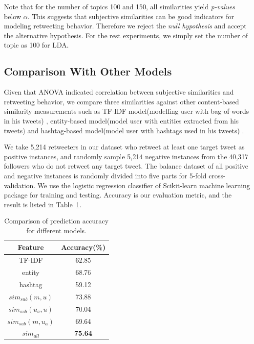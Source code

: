 \documentclass[letterpaper]{article}
\begin{document}
Note that for the number of topics 100 and 150, all similarities yield \textit{p-values} below $ \alpha $. This suggests that subjective similarities can be good indicators for modeling retweeting behavior. 
Therefore we reject the \textit{null hypothesis} and accept the alternative hypothesis.
For the rest experiments, we simply set the number of topic as 100 for LDA. 

\subsection{Comparison With Other Models}
\label{Comparison}

Given that ANOVA indicated correlation between subjective similarities and retweeting behavior, we compare three similarities against other content-based similarity measurements such as TF-IDF model(modelling user with bag-of-words in his tweets) \cite{Luo:2013RMF}, entity-based model(model user with entities extracted from his tweets) and hashtag-based model(model user with hashtags used in his tweets) \cite{Abel:2011AUM}.

We take 5,214 retweeters in our dataset who retweet at least one target tweet as positive instances, and randomly sample 5,214 negative instances from the 40,317 followers who do not retweet any target tweet.
The balance dataset of all positive and negative instances is randomly divided into five parts for 5-fold cross-validation. 
We use the logistic regression classifier of Scikit-learn machine learning package \cite{scikit-learn} for training and testing.
Accuracy is our evaluation metric, and the result is listed in Table~\ref{tab3}.
\begin{table}[h]
\centering
\caption{Comparison of prediction accuracy for different models. }
\label{tab3}
\begin{tabular}{|c|c|}
\hline
Feature & Accuracy(\%) \\
\hline
TF-IDF & 62.85  \\
entity & 68.76 \\
hashtag & 59.12  \\
$ sim_{sub} \left( m,u \right) $ & 73.88\\
$ sim_{sub}\left( u_{a},u \right)  $ & 70.04\\
$ sim_{sub}\left( m,u_{a} \right)  $ &69.64\\
$ sim_{all}  $ &\textbf{75.64}\\
\hline
\end{tabular}
\end{table}
\end{document}
